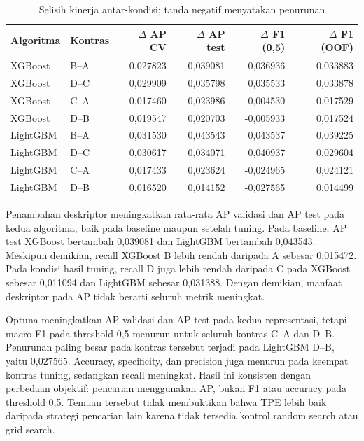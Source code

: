 \begin{table}[htbp]
\centering
\caption{Selisih kinerja antar-kondisi; tanda negatif menyatakan penurunan}
\label{tab:kontras_kandidat}
\small
\setlength{\tabcolsep}{4pt}
\begin{tabular}{llrrrr}
\toprule
Algoritma & Kontras & $\Delta$ AP CV & $\Delta$ AP test & $\Delta$ F1 (0,5) & $\Delta$ F1 (OOF) \\
\midrule
XGBoost & B--A & 0,027823 & 0,039081 & 0,036936 & 0,033883 \\
XGBoost & D--C & 0,029909 & 0,035798 & 0,035533 & 0,033878 \\
XGBoost & C--A & 0,017460 & 0,023986 & -0,004530 & 0,017529 \\
XGBoost & D--B & 0,019547 & 0,020703 & -0,005933 & 0,017524 \\
LightGBM & B--A & 0,031530 & 0,043543 & 0,043537 & 0,039225 \\
LightGBM & D--C & 0,030617 & 0,034071 & 0,040937 & 0,029604 \\
LightGBM & C--A & 0,017433 & 0,023624 & -0,024965 & 0,024121 \\
LightGBM & D--B & 0,016520 & 0,014152 & -0,027565 & 0,014499 \\
\bottomrule
\end{tabular}
\end{table}

Penambahan deskriptor meningkatkan rata-rata AP validasi dan AP test pada kedua algoritma, baik pada baseline maupun setelah tuning. Pada baseline, AP test XGBoost bertambah 0,039081 dan LightGBM bertambah 0,043543. Meskipun demikian, recall XGBoost B lebih rendah daripada A sebesar 0,015472. Pada kondisi hasil tuning, recall D juga lebih rendah daripada C pada XGBoost sebesar 0,011094 dan LightGBM sebesar 0,031388. Dengan demikian, manfaat deskriptor pada AP tidak berarti seluruh metrik meningkat.

Optuna meningkatkan AP validasi dan AP test pada kedua representasi, tetapi macro F1 pada threshold 0,5 menurun untuk seluruh kontras C--A dan D--B. Penurunan paling besar pada kontras tersebut terjadi pada LightGBM D--B, yaitu 0,027565. Accuracy, specificity, dan precision juga menurun pada keempat kontras tuning, sedangkan recall meningkat. Hasil ini konsisten dengan perbedaan objektif: pencarian menggunakan AP, bukan F1 atau accuracy pada threshold 0,5. Temuan tersebut tidak membuktikan bahwa TPE lebih baik daripada strategi pencarian lain karena tidak tersedia kontrol random search atau grid search.

